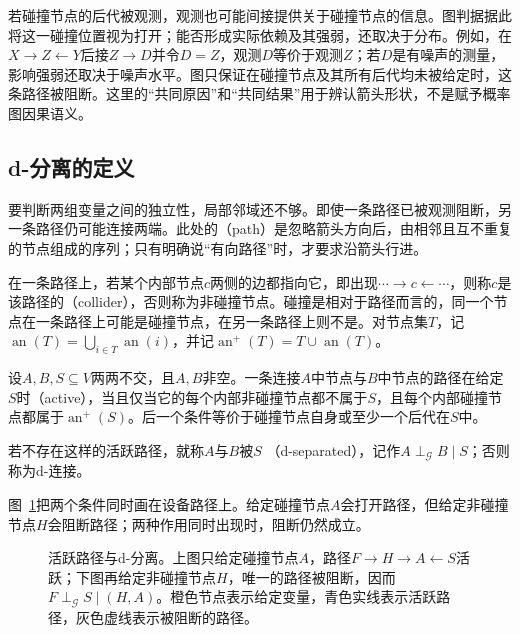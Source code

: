 若碰撞节点的后代被观测，观测也可能间接提供关于碰撞节点的信息。图判据据此将这一碰撞位置视为打开；能否形成实际依赖及其强弱，还取决于分布。例如，在$X\to Z\leftarrow Y$后接$Z\to D$并令$D=Z$，观测$D$等价于观测$Z$；若$D$是有噪声的测量，影响强弱还取决于噪声水平。图只保证在碰撞节点及其所有后代均未被给定时，这条路径被阻断。这里的“共同原因”和“共同结果”用于辨认箭头形状，不是赋予概率图因果语义。

\subsection{d-分离的定义}
\label{sec:pgm-directed-d-separation}

要判断两组变量之间的独立性，局部邻域还不够。即使一条路径已被观测阻断，另一条路径仍可能连接两端。此处的（path）是忽略箭头方向后，由相邻且互不重复的节点组成的序列；只有明确说“有向路径”时，才要求沿箭头行进。

在一条路径上，若某个内部节点$c$两侧的边都指向它，即出现$\cdots\to c\leftarrow\cdots$，则称$c$是该路径的（collider），否则称为非碰撞节点。碰撞是相对于路径而言的，同一个节点在一条路径上可能是碰撞节点，在另一条路径上则不是。对节点集$T$，记$\operatorname{an}(T)=\bigcup_{i\in T}\operatorname{an}(i)$，并记$\operatorname{an}^{+}(T)=T\cup\operatorname{an}(T)$。

\begin{definition}[活跃路径与d-分离]
  \label{def:pgm-directed-d-separation}
  设$A,B,S\subseteq V$两两不交，且$A,B$非空。一条连接$A$中节点与$B$中节点的路径在给定$S$时（active），当且仅当它的每个内部非碰撞节点都不属于$S$，且每个内部碰撞节点都属于$\operatorname{an}^{+}(S)$。后一个条件等价于碰撞节点自身或至少一个后代在$S$中。

  若不存在这样的活跃路径，就称$A$与$B$被$S$ （d-separated），记作$A\perp_{\mathcal{G}} B\mid S$；否则称为d-连接。
\end{definition}

图~\ref{fig:pgm-directed-active-path}把两个条件同时画在设备路径上。给定碰撞节点$A$会打开路径，但给定非碰撞节点$H$会阻断路径；两种作用同时出现时，阻断仍然成立。

\begin{figure}[htbp]
  \centering
  
  \caption{活跃路径与d-分离。上图只给定碰撞节点$A$，路径$F\to H\to A\leftarrow S$活跃；下图再给定非碰撞节点$H$，唯一的路径被阻断，因而$F\perp_{\mathcal{G}}S\mid(H,A)$。橙色节点表示给定变量，青色实线表示活跃路径，灰色虚线表示被阻断的路径。}
  \label{fig:pgm-directed-active-path}
\end{figure}

